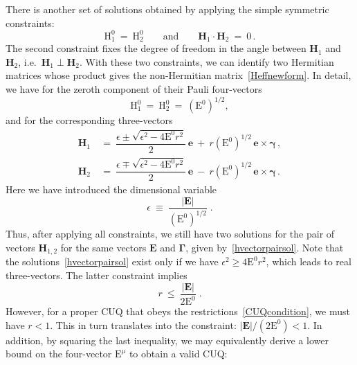\documentclass[12pt,a4paper]{article}
\begin{document}
There is another set of solutions obtained by applying the simple symmetric constraints:
\begin{equation}
    \mathrm{H}_1^0\: =\: \mathrm{H}_2^0 \qquad \text{and}\qquad \mathbf{H}_1\cdot\mathbf{H}_2\: =\: 0\label{constraintCUQham}\,.
\end{equation}
The second constraint fixes the degree of freedom in the angle between $\mathbf{H}_1$ and $\mathbf{H}_2$, i.e.~$\mathbf{H}_1\perp \mathbf{H}_2$. With these two constraints, we can identify two Hermitian matrices whose product gives the non-Hermitian matrix~\eqref{Heffnewform}. In detail, we have for the zeroth component of their Pauli four-vectors
\begin{equation}
    \mathrm{H}_1^0\: =\: \mathrm{H}_2^0\: =\: (\mathrm{E}^0)^{1/2},
\end{equation}
and for the corresponding three-vectors 
\begin{equation}
    \begin{aligned}
        \mathbf{H}_1\ &=\ \dfrac{\epsilon\pm\sqrt{\epsilon^2 - 4\mathrm{E}^0r^2}}{2}\,\mathbf{e}\: +\: r (\mathrm{E}^0)^{1/2}\,\mathbf{e}\times\boldsymbol{\gamma}\,,\\
        \mathbf{H}_2\ &=\ \dfrac{\epsilon\mp\sqrt{\epsilon^2 - 4\mathrm{E}^0r^2}}{2}\,\mathbf{e}\: -\: r(\mathrm{E}^0)^{1/2}\,\mathbf{e}\times\boldsymbol{\gamma}\, .
    \end{aligned}\label{hvectorpairsol}
\end{equation}
Here we have introduced the dimensional variable
\begin{equation}
    \epsilon\: \equiv\: \dfrac{|\mathbf{E}|}{(\mathrm{E^0})^{1/2}}\;.
\end{equation}
Thus, after applying all constraints, we still have two solutions for the pair of vectors $\mathbf{H}_{1,2}$ for the same vectors $\mathbf{E}$ and $\boldsymbol{\Gamma}$, given by~\eqref{hvectorpairsol}. Note that the solutions~\eqref{hvectorpairsol} exist only if we have $\epsilon^2 \geq4\mathrm{E}^0r^2$, which leads to real three-vectors. The latter constraint
implies
\begin{equation}
r\: \le\: \dfrac{|\mathbf{E}|}{2\mathrm{E}^0}\;.\label{CUQcontraintonr}
\end{equation}
However, for a proper CUQ that obeys the restrictions~\eqref{CUQcondition}, we must have $r<1$. This in turn translates into the constraint: $|\mathbf{E}|/(2\mathrm{E}^0) < 1$. In addition, 
by squaring the last inequality, we may equivalently derive a lower bound on the four-vector $\mathrm{E}^\mu$ to obtain a valid CUQ:
\end{document}
